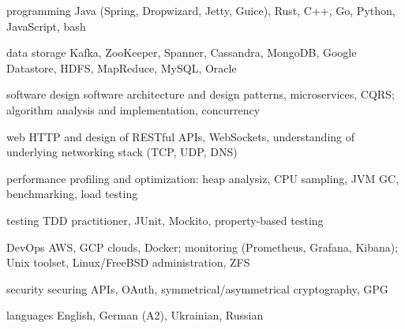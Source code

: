 

\begin{cvskills}

  \cvskill
    {programming} %
    {Java (Spring, Dropwizard, Jetty, Guice), Rust, C++, Go, Python, JavaScript, bash} %

  \cvskill
    {data storage} %
    {Kafka, ZooKeeper, Spanner, Cassandra, MongoDB, Google Datastore, HDFS, MapReduce, MySQL, Oracle} %

  \cvskill
    {software design} %
    {software architecture and design patterns, microservices, CQRS; algorithm analysis and implementation, concurrency} %

  \cvskill
    {web} %
    {HTTP and design of RESTful APIs, WebSockets, understanding of underlying networking stack (TCP, UDP, DNS)} %

  \cvskill
    {performance} %
    {profiling and optimization: heap analysiz, CPU sampling, JVM GC, benchmarking, load testing} %

  \cvskill
    {testing} %
    {TDD practitioner, JUnit, Mockito, property-based testing} %

  \cvskill
    {DevOps} %
		{AWS, GCP clouds, Docker; monitoring (Prometheus, Grafana, Kibana); Unix toolset, Linux/FreeBSD administration, ZFS} %

  \cvskill
    {security} %
    {securing APIs, OAuth, symmetrical/asymmetrical cryptography, GPG} %

  \cvskill
    {languages} %
    {English, German (A2), Ukrainian, Russian} %

\end{cvskills}
